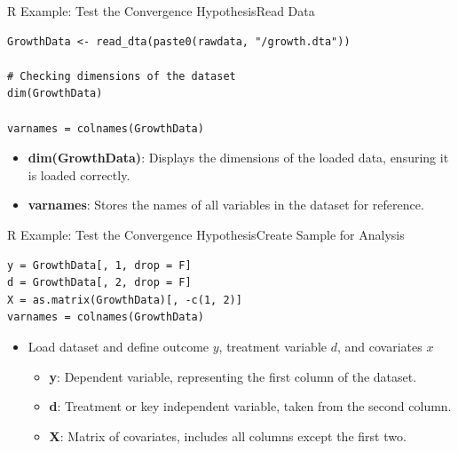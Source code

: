\documentclass[hyperref={pdfpagelabels=false}]{beamer}
\begin{document}
\begin{frame}[fragile]{R Example: Test the Convergence Hypothesis}{Read Data}
\begin{lstlisting}
GrowthData <- read_dta(paste0(rawdata, "/growth.dta"))

# Checking dimensions of the dataset
dim(GrowthData)

varnames = colnames(GrowthData)
\end{lstlisting}
	\begin{itemize}
		\item \textbf{dim(GrowthData)}: Displays the dimensions of the loaded data, ensuring it is loaded correctly.
		
		\vspace{0.2cm}
		
		\item \textbf{varnames}: Stores the names of all variables in the dataset for reference.
		
	\end{itemize}
\end{frame}






\begin{frame}[fragile]{R Example: Test the Convergence Hypothesis}{Create Sample for Analysis}
\begin{lstlisting}
y = GrowthData[, 1, drop = F]
d = GrowthData[, 2, drop = F]
X = as.matrix(GrowthData)[, -c(1, 2)]
varnames = colnames(GrowthData)
\end{lstlisting}
	\begin{itemize}
		\item Load dataset and define outcome $y$, treatment variable $d$, and covariates $x$
		\begin{itemize}
			\vspace{0.2cm}
			\item \textbf{y}: Dependent variable, representing the first column of the dataset.
			\vspace{0.2cm}
			\item \textbf{d}: Treatment or key independent variable, taken from the second column.
			\vspace{0.2cm}
			\item \textbf{X}: Matrix of covariates, includes all columns except the first two.
		\end{itemize}
		
		
	\end{itemize}
\end{frame}
\end{document}
